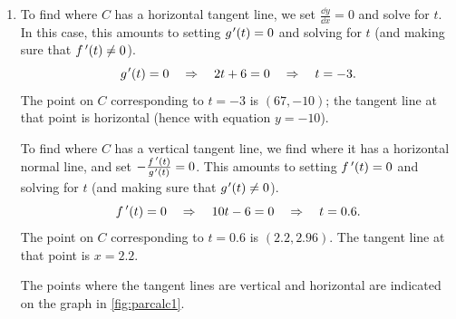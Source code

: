 \begin{example}
\begin{enumerate}
	\item	To find where $C$ has a horizontal tangent line, we set $\frac{\dd y}{\dd x}=0$ and solve for $t$. In this case, this amounts to setting $g\primeskip'(t)=0$ and solving for $t$ (and making sure that $f\,'(t)\neq 0$). 
\[g\primeskip'(t)=0 \quad \Rightarrow \quad 2t+6=0 \quad \Rightarrow \quad t=-3.\]
	The point on $C$ corresponding to $t=-3$ is $(67,-10)$; the tangent line at that point is horizontal (hence with equation $y=-10$).
		
	To find where $C$ has a vertical tangent line, we find where it has a horizontal normal line, and set $-\frac{\fp(t)}{g\primeskip'(t)}=0$. This amounts to setting $f\,'(t)=0$ and solving for $t$ (and making sure that $g\primeskip'(t)\neq 0$). 
	\[f\,'(t)=0 \quad \Rightarrow \quad 10t-6=0 \quad \Rightarrow \quad t=0.6.\]
	The point on $C$ corresponding to $t=0.6$ is $(2.2,2.96)$. The tangent line at that point is $x=2.2$.
	
	The points where the tangent lines are vertical and horizontal are indicated on the graph in \autoref{fig:parcalc1}.
\end{enumerate}
\end{example}

